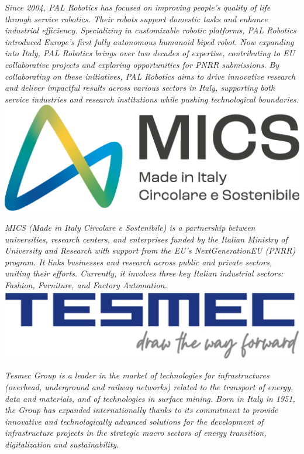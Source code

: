 \documentclass[
	openany, %
	parskip=full, %
	12pt, %
	a4paper, %
]{conferencebooklet} %
\begin{document}
\begin{multicols*}{2}
    \textit{Since 2004, PAL Robotics has focused on improving people's quality of life through service robotics. Their robots support domestic tasks and enhance industrial efficiency. Specializing in customizable robotic platforms, PAL Robotics introduced Europe’s first fully autonomous humanoid biped robot. Now expanding into Italy, PAL Robotics brings over two decades of expertise, contributing to EU collaborative projects and exploring opportunities for PNRR submissions. By collaborating on these initiatives, PAL Robotics aims to drive innovative research and deliver impactful results across various sectors in Italy, supporting both service industries and research institutions while pushing technological boundaries.} \\

    \hfill\includegraphics[width=\sponsorscaling\linewidth]{logos/mics.png}\hspace*{\fill}
    
    \textit{MICS (Made in Italy Circolare e Sostenibile) is a partnership between universities, research centers, and enterprises funded by the Italian Ministry of University and Research with support from the EU's NextGenerationEU (PNRR) program. It links businesses and research across public and private sectors, uniting their efforts. Currently, it involves three key Italian industrial sectors: Fashion, Furniture, and Factory Automation.} \\

   
    \hfill\includegraphics[width=\sponsorscaling\linewidth]{logos/tesmec.jpg}\hspace*{\fill}
    
    \textit{Tesmec Group is a leader in the market of technologies for infrastructures (overhead, underground and railway networks) related to the transport of energy, data and materials, and of technologies in surface mining. Born in Italy in 1951, the Group has expanded internationally thanks to its commitment to provide innovative and technologically advanced solutions for the development of infrastructure projects in the strategic macro sectors of energy transition, digitalization and sustainability.} \\



\end{multicols*}
\end{document}
